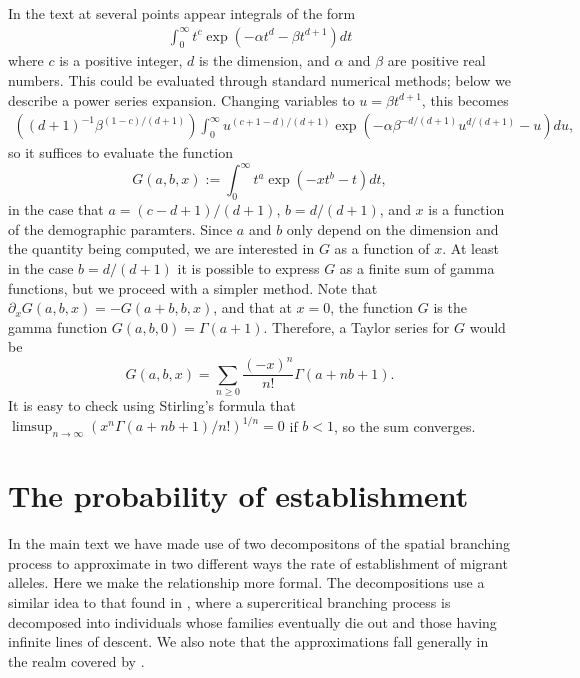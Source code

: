\documentclass{article}
\begin{document}
In the text at several points appear integrals of the form
\begin{align}
  \int_0^\infty t^c \exp \left( - \alpha t^d - \beta t^{d+1} \right) dt 
\end{align}
where $c$ is a positive integer, $d$ is the dimension, and $\alpha$ and $\beta$ are positive real numbers.
This could be evaluated through standard numerical methods; below we describe a power series expansion.
Changing variables to $u = \beta t^{d+1}$, this becomes
\begin{align}
    \left( (d+1)^{-1} \beta^{ (1-c)/(d+1) } \right) \int_0^\infty u^{(c+1-d)/(d+1)} \exp\left( - \alpha \beta^{-d/(d+1)} u^{d/(d+1)} - u \right) du ,
\end{align}
so it suffices to evaluate the function
\begin{equation}
    G(a,b,x) := \int_0^\infty  t^a \exp\left( -x t^b - t \right) dt ,
\end{equation}
in the case that $a=(c-d+1)/(d+1)$, $b=d/(d+1)$, and $x$ is a function of the demographic paramters.
Since $a$ and $b$ only depend on the dimension and the quantity being computed,
we are interested in $G$ as a function of $x$.
At least in the case $b=d/(d+1)$ it is possible to express $G$ as a finite sum of gamma functions,
but we proceed with a simpler method.
Note that $\partial_x G(a,b,x) = -G(a+b,b,x)$,
and that at $x=0$, the function $G$ is the gamma function $G(a,b,0) = \Gamma(a+1)$.
Therefore, a Taylor series for $G$ would be
\[
    G(a,b,x) = \sum_{n \ge 0} \frac{(-x)^n}{n!} \Gamma(a+nb+1) .
\]
It is easy to check using Stirling's formula that $\limsup_{n \to \infty} ( x^n \Gamma(a+nb+1)/n! )^{1/n} = 0$
if $b<1$, so the sum converges.


\section{The probability of establishment}
\label{ss:prob_estab}


In the main text we have made use of two decompositons of the spatial branching process
to approximate in two different ways the rate of establishment of migrant alleles.
Here we make the relationship more formal.
The decompositions use a similar idea to that found in \citep[section D.12]{athreyaney},
where a supercritical branching process is decomposed into individuals whose families eventually die out
and those having infinite lines of descent.
We also note that the approximations fall generally in the realm covered by \citet{aldouspoissonclumping}.
\end{document}
